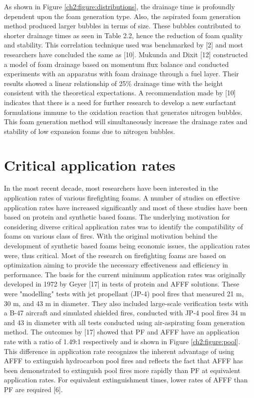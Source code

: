 \documentclass[12pt]{report}
\begin{document}
As shown in Figure \ref{ch2:figure:distributions}, the drainage time is profoundly dependent upon the foam generation type. Also, the aspirated foam generation method produced larger bubbles in terms of size. These bubbles contributed to shorter drainage times as seen in Table 2.2, hence the reduction of foam quality and stability. This correlation technique used was benchmarked by [2] and most researchers have concluded the same as [10]. Mukunda and Dixit [12] constructed a model of foam drainage based on momentum flux balance and conducted experiments with an apparatus with foam drainage through a fuel layer. Their results showed a linear relationship of 25\% drainage time with the height consistent with the theoretical expectations. A recommendation made by [10] indicates that there is a need for further research to develop a new surfactant formulations immune to the oxidation reaction that generates nitrogen bubbles. This foam generation method will simultaneously increase the drainage rates and stability of low expansion foams due to nitrogen bubbles.

\section{Critical application rates}
In the most recent decade, most researchers have been interested in the application rates of various firefighting foams. A number of studies on effective application rates have increased significantly and most of these studies have been based on protein and synthetic based foams. The underlying motivation for considering diverse critical application rates was to identify the compatibility of foams on various class of fires. With the original motivation behind the development of synthetic based foams being economic issues, the application rates were, thus critical.
Most of the research on firefighting foams are based on optimization aiming to provide the necessary effectiveness and efficiency in performance. The basis for the current minimum application rates was originally developed in 1972 by Geyer [17] in tests of protein and AFFF solutions. These were "modelling" tests with jet propellant (JP-4) pool fires that measured 21 m, 30 m, and 43 m in diameter. They also included large-scale verification tests with a B-47 aircraft and simulated shielded fires, conducted with JP-4 pool fires 34 m and 43 in diameter with all tests conducted using air-aspirating foam generation method. The outcomes by [17] showed that PF and AFFF have an application rate with a ratio of 1.49:1 respectively and is shown in Figure \ref{ch2:figure:pool}. This difference in application rate recognizes the inherent advantage of using AFFF to extinguish hydrocarbon pool fires and reflects the fact that AFFF has been demonstrated to extinguish pool fires more rapidly than PF at equivalent application rates. For equivalent extinguishment times, lower rates of AFFF than PF are required [6].
\end{document}
